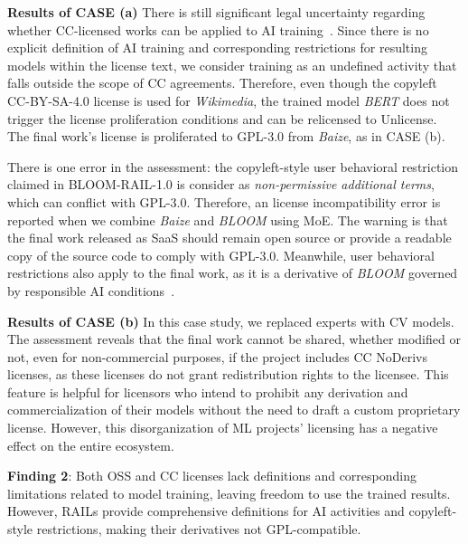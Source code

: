 \textbf{Results of CASE  (a)}
There is still significant legal uncertainty regarding whether CC-licensed works can be applied to AI training~\cite{creative2023artificial}.
Since there is no explicit definition of AI training and corresponding restrictions for resulting models within the license text, we consider training as an undefined activity that falls outside the scope of CC agreements.
Therefore, even though the copyleft CC-BY-SA-4.0 license is used for \textit{Wikimedia}, the trained model \textit{BERT} does not trigger the license proliferation conditions and can be relicensed to Unlicense.
The final work's license is proliferated to GPL-3.0 from \textit{Baize}, as in CASE  (b).

There is one error in the assessment: the copyleft-style user behavioral restriction claimed in BLOOM-RAIL-1.0 is consider as \textit{non-permissive additional terms}, which can conflict with GPL-3.0.
Therefore, an license incompatibility error is reported when we combine \textit{Baize} and \textit{BLOOM} using MoE.
The warning is that the final work released as SaaS should remain open source or provide a readable copy of the source code to comply with GPL-3.0. 
Meanwhile, user behavioral restrictions also apply to the final work, as it is a derivative of \textit{BLOOM} governed by responsible AI conditions~\cite{contractor2022behavioral}.

\textbf{Results of CASE  (b)}
In this case study, we replaced experts with CV models. 
The assessment reveals that the final work cannot be shared, whether modified or not, even for non-commercial purposes, if the project includes CC NoDerivs licenses, as these licenses do not grant redistribution rights to the licensee.
This feature is helpful for licensors who intend to prohibit any derivation and commercialization of their models without the need to draft a custom proprietary license.
However, this disorganization of ML projects' licensing has a negative effect on the entire ecosystem.

\begin{tcolorbox} 
\textbf{Finding 2}: Both OSS and CC licenses lack definitions and corresponding limitations related to model training, leaving freedom to use the trained results. 
However, RAILs provide comprehensive definitions for AI activities and copyleft-style restrictions, making their derivatives not GPL-compatible.
\end{tcolorbox}

